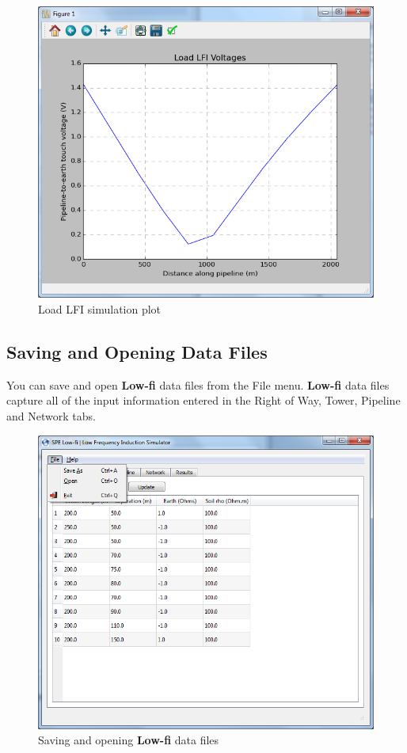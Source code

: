 \documentclass{article}
\begin{document}
\begin{figure}[!htpb]
\begin{center}
\caption{Load LFI simulation plot}
\label{fig:results_plot}
\includegraphics[width=0.7\linewidth]{./Figures/load_lfi_plot.png}
\end{center}
\end{figure}

\newpage
\subsection{Saving and Opening Data Files}
You can save and open \textbf{Low-fi} data files from the File menu. \textbf{Low-fi} data files capture all of the input information entered in the Right of Way, Tower, Pipeline and Network tabs. 

\begin{figure}[!htpb]
\begin{center}
\caption{Saving and opening \textbf{Low-fi} data files}
\label{fig:saveload}
\includegraphics[width=0.9\linewidth]{./Figures/RoW_with_file_menu.png}
\end{center}
\end{figure}

\newpage


\end{document}
